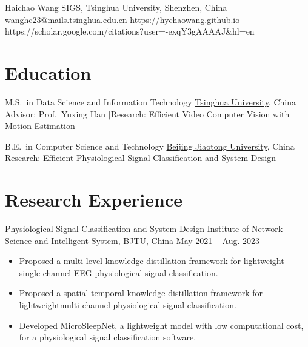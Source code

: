 \documentclass[11pt]{article}
\begin{document}

\cvheader
    {Haichao Wang}
    {SIGS, Tsinghua University, Shenzhen, China}
    {wanghc23@mails.tsinghua.edu.cn}
    {https://hychaowang.github.io}
    {https://scholar.google.com/citations?user=-exqY3gAAAAJ\&hl=en}


\section{Education}

    {M.S.\ in Data Science and Information Technology}
    {\href{https://www.tsinghua.edu.cn/en/}{Tsinghua University}, China}
    {Advisor: Prof.\ Yuxing Han \enspace$\mid$\enspace Research: Efficient Video Computer Vision with Motion Estimation}

    {B.E.\ in Computer Science and Technology}
    {\href{https://bjtu.edu.cn}{Beijing Jiaotong University}, China}
    {Research: Efficient Physiological Signal Classification and System Design}


\section{Research Experience}

\resentry
    {Physiological Signal Classification and System Design}
    {\href{http://insis.bjtu.edu.cn/}{Institute of Network Science and Intelligent System, BJTU, China}}
    {May 2021 -- Aug. 2023}
    {\begin{itemize}
        \item Proposed a multi-level knowledge distillation framework for lightweight single-channel EEG physiological signal classification.
        \item Proposed a spatial-temporal knowledge distillation framework for lightweightmulti-channel physiological signal classification.
        \item Developed MicroSleepNet, a lightweight model with low computational cost, for a physiological signal classification software.
    \end{itemize}}
\end{document}

